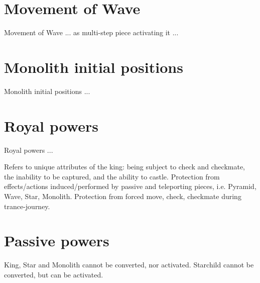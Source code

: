 %
%
%

\section*{Movement of Wave}
\label{sec:Definitions/Movement of Wave}

Movement of Wave ... as multi-step piece activating it  ...


\section*{Monolith initial positions}
\label{sec:Definitions/Monolith initial positions}

Monolith initial positions ...

\section*{Royal powers}
\label{sec:Definitions/Royal powers}

Royal powers ...

    Refers to unique attributes of the king: being subject to check and checkmate, the inability to be captured, and the ability to castle.
    Protection from effects/actions induced/performed by passive and teleporting pieces, i.e. Pyramid, Wave, Star, Monolith.
    Protection from forced move, check, checkmate during trance-journey.


\section*{Passive powers}
\label{sec:Definitions/Passive powers}

King, Star and Monolith cannot be converted, nor activated.
Starchild cannot be converted, but can be activated.

